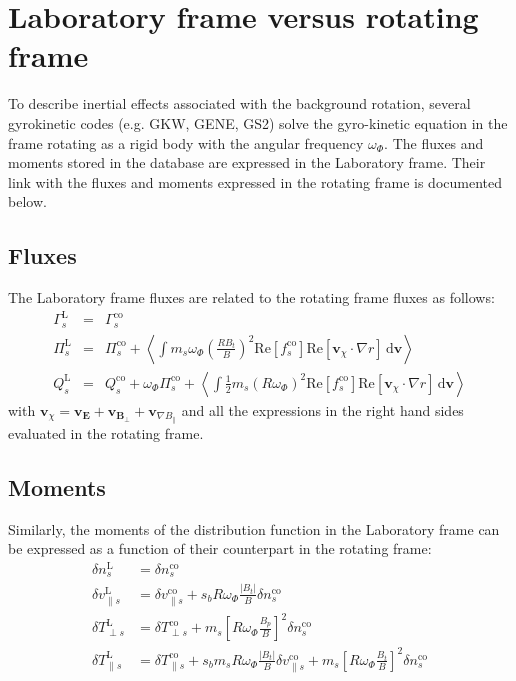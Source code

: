 \documentclass[a4paper]{report}
\begin{document}
\section{Laboratory frame versus rotating frame} \label{sec:labrotframes}
To describe inertial effects associated with the background rotation, several gyrokinetic codes (e.g. GKW, GENE, GS2) solve the gyro-kinetic equation in the frame rotating as a rigid body with the angular frequency $\omega_\Phi$. The fluxes and moments stored in the database are expressed in the Laboratory frame. Their link with the fluxes and moments expressed in the rotating frame is documented below.

\subsection{Fluxes} 
The Laboratory frame fluxes are related to the rotating frame fluxes as follows:
\begin{eqnarray}
\Gamma_s^\textrm{L} &=& \Gamma_s^\textrm{co} \\
\Pi_s^\textrm{L} &=& \Pi_s^\textrm{co} + \left< \int m_s\omega_\Phi\left(\frac{RB_t}{B}\right)^2 \textrm{Re}\left[f_s^\textrm{co}\right]\textrm{Re}\left[ \mathbf{v}_\chi\cdot \nabla r \right] \,\textrm{d}\mathbf{v}\right>\\
Q_s^\textrm{L} &=& Q_s^\textrm{co} + \omega_\Phi \Pi_s^\textrm{co}
+ \left< \int \frac{1}{2}m_s(R\omega_\Phi)^2 \textrm{Re}\left[f_s^\textrm{co}\right]\textrm{Re}\left[ \mathbf{v}_\chi\cdot \nabla r \right]\,\textrm{d}\mathbf{v}\right> 
\end{eqnarray}
with $\mathbf{v}_\chi=\mathbf{v}_\mathbf{E} + \mathbf{v}_{\mathbf{B}_\perp}+ \mathbf{v}_{\nabla B_\parallel}$ and all the expressions in the right hand sides evaluated in the rotating frame. 

\subsection{Moments} 
Similarly, the moments of the distribution function in the Laboratory frame can be expressed as a function of their counterpart in the rotating frame:
\begin{align*}
\delta n_s^\textrm{L} & = \delta n_s^\textrm{co} \\
\delta v_{\parallel s}^\textrm{L} & = \delta v_{\parallel s}^\textrm{co} + s_bR\omega_\Phi\frac{|B_t|}{B}\delta n_s^\textrm{co} \\
\delta T_{\perp s}^\textrm{L} & = \delta T_{\perp s}^\textrm{co} + m_s\left[R\omega_\Phi\frac{B_p}{B}\right]^2 \delta n_s^\textrm{co}\\
\delta T_{\parallel s}^\textrm{L} & = \delta T_{\parallel s}^\textrm{co} + s_bm_s R\omega_\Phi\frac{|B_t|}{B} \delta v_{\parallel s}^\textrm{co} + m_s\left[R\omega_\Phi\frac{B_t}{B}\right]^2 \delta n_s^\textrm{co}
\end{align*}
\end{document}
